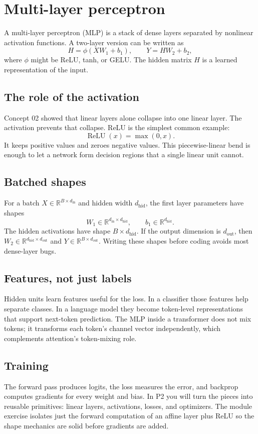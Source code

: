 \section{Multi-layer perceptron}\label{sec:04}

A multi-layer perceptron (MLP) is a stack of dense layers separated by nonlinear
activation functions. A two-layer version can be written as
\[
  H = \phi(XW_1 + b_1),
  \qquad
  Y = HW_2 + b_2,
\]
where $\phi$ might be ReLU, tanh, or GELU. The hidden matrix $H$ is a learned
representation of the input.

\subsection*{The role of the activation}
Concept 02 showed that linear layers alone collapse into one linear layer. The
activation prevents that collapse. ReLU is the simplest common example:
\[
  \operatorname{ReLU}(x) = \max(0,x).
\]
It keeps positive values and zeroes negative values. This piecewise-linear bend
is enough to let a network form decision regions that a single linear unit
cannot.

\subsection*{Batched shapes}
For a batch $X \in \mathbb{R}^{B \times d_{\text{in}}}$ and hidden width
$d_{\text{hid}}$, the first layer parameters have shapes
\[
  W_1 \in \mathbb{R}^{d_{\text{in}} \times d_{\text{hid}}},
  \qquad
  b_1 \in \mathbb{R}^{d_{\text{hid}}}.
\]
The hidden activations have shape $B \times d_{\text{hid}}$. If the output
dimension is $d_{\text{out}}$, then
$W_2 \in \mathbb{R}^{d_{\text{hid}} \times d_{\text{out}}}$ and
$Y \in \mathbb{R}^{B \times d_{\text{out}}}$. Writing these shapes before
coding avoids most dense-layer bugs.

\subsection*{Features, not just labels}
Hidden units learn features useful for the loss. In a classifier those features
help separate classes. In a language model they become token-level
representations that support next-token prediction. The MLP inside a transformer
does not mix tokens; it transforms each token's channel vector independently,
which complements attention's token-mixing role.

\subsection*{Training}
The forward pass produces logits, the loss measures the error, and backprop
computes gradients for every weight and bias. In P2 you will turn the pieces
into reusable primitives: linear layers, activations, losses, and optimizers.
The module exercise isolates just the forward computation of an affine layer
plus ReLU so the shape mechanics are solid before gradients are added.

